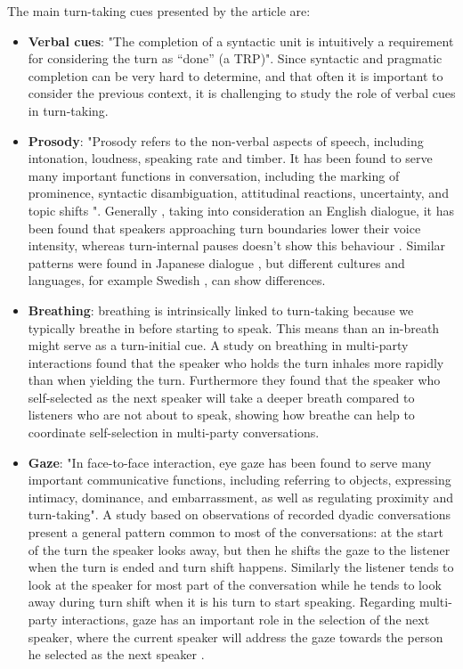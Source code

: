 \documentclass[../main.tex]{subfiles}
\begin{document}
The main turn-taking cues presented by the article are: 
\begin{itemize}
\item \textbf{Verbal cues}: "The completion of a syntactic unit is intuitively a requirement for considering the turn as “done” (a TRP)". Since syntactic and pragmatic completion can be very hard to determine, and that often it is important to consider the previous context, it is challenging to study the role of verbal cues in turn-taking.

\item \textbf{Prosody}: "Prosody refers to the non-verbal aspects
of speech, including intonation, loudness, speaking rate and timber. It has been found to serve many important functions in conversation, including the marking of prominence, syntactic disambiguation, attitudinal reactions, uncertainty, and topic shifts \cite{ward2019prosodic}". Generally , taking into consideration an English dialogue, it has been found that speakers approaching turn boundaries lower their voice intensity, whereas turn-internal pauses doesn't show this behaviour \cite{gravano2011turn}. Similar patterns were found in Japanese dialogue \cite{koiso1998analysis}, but different cultures and languages, for example Swedish \cite{edlund2005exploring}, can show differences.

\item \textbf{Breathing}: breathing is intrinsically linked to turn-taking because we typically breathe in before starting to speak. This means than an in-breath might serve as a turn-initial cue. A study on breathing in multi-party interactions \cite{ishii2014analysis} found that the speaker who holds the turn inhales more rapidly than when yielding the turn. Furthermore they found that the speaker who self-selected as the next speaker will take a deeper breath compared to listeners who are not about to speak, showing how breathe can help to coordinate self-selection in multi-party conversations. 

\item \textbf{Gaze}: "In face-to-face interaction, eye gaze has been found to serve many important communicative functions, including referring to
objects, expressing intimacy, dominance, and embarrassment, as well as regulating proximity and turn-taking". A study based on observations of recorded dyadic conversations \cite{kendon1967some} present a general pattern common to most of the conversations: at the start of the turn the speaker looks away, but then he shifts the gaze to the listener when the turn is ended and turn shift happens. Similarly the listener tends to look at the speaker for most part of the conversation while he tends to look away during turn shift when it is his turn to start speaking. Regarding multi-party interactions, gaze has an important role in the selection of the next speaker, where the current speaker will address the gaze towards the person he selected as the next speaker \cite{auer2018gaze}.


\end{itemize}
\end{document}
